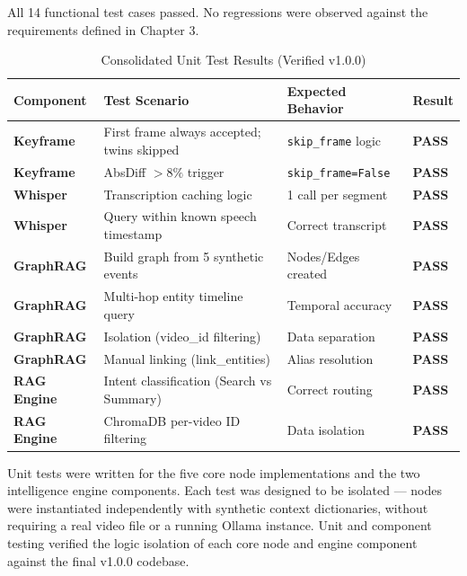 All 14 functional test cases passed. No regressions were observed against the requirements defined in Chapter 3.

\noindent
\begin{table}[H]
\centering
\scriptsize
\caption{Consolidated Unit Test Results (Verified v1.0.0)}
\label{tab:unit_consolidated}
\begin{tabular}{|p{1.6cm}|p{5.6cm}|p{2.0cm}|p{1.0cm}|}
\hline
\rowcolor[HTML]{EFEFEF}
\textbf{Component} & \textbf{Test Scenario} & \textbf{Expected Behavior} & \textbf{Result} \\ \hline
\textbf{Keyframe} & First frame always accepted; twins skipped & \texttt{skip\_frame} logic & \textbf{PASS} \\ \hline
\textbf{Keyframe} & AbsDiff $>8\%$ trigger & \texttt{skip\_frame=False} & \textbf{PASS} \\ \hline
\textbf{Whisper} & Transcription caching logic & 1 call per segment & \textbf{PASS} \\ \hline
\textbf{Whisper} & Query within known speech timestamp & Correct transcript & \textbf{PASS} \\ \hline
\textbf{GraphRAG} & Build graph from 5 synthetic events & Nodes/Edges created & \textbf{PASS} \\ \hline
\textbf{GraphRAG} & Multi-hop entity timeline query & Temporal accuracy & \textbf{PASS} \\ \hline
\textbf{GraphRAG} & Isolation (video\_id filtering) & Data separation & \textbf{PASS} \\ \hline
\textbf{GraphRAG} & Manual linking (link\_entities) & Alias resolution & \textbf{PASS} \\ \hline
\textbf{RAG Engine} & Intent classification (Search vs Summary) & Correct routing & \textbf{PASS} \\ \hline
\textbf{RAG Engine} & ChromaDB per-video ID filtering & Data isolation & \textbf{PASS} \\ \hline
\end{tabular}
\end{table}


Unit tests were written for the five core node implementations and the two intelligence engine components. Each test was designed to be isolated --- nodes were instantiated independently with synthetic context dictionaries, without requiring a real video file or a running Ollama instance. Unit and component testing verified the logic isolation of each core node and engine component against the final v1.0.0 codebase.

